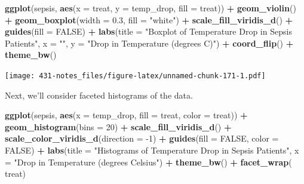 \documentclass[
]{book}
\newenvironment{Shaded}{\begin{snugshade}}{\end{snugshade}}
\newcommand{\DataTypeTok}[1]{\textcolor[rgb]{0.13,0.29,0.53}{#1}}
\newcommand{\DecValTok}[1]{\textcolor[rgb]{0.00,0.00,0.81}{#1}}
\newcommand{\FloatTok}[1]{\textcolor[rgb]{0.00,0.00,0.81}{#1}}
\newcommand{\KeywordTok}[1]{\textcolor[rgb]{0.13,0.29,0.53}{\textbf{#1}}}
\newcommand{\NormalTok}[1]{#1}
\newcommand{\OperatorTok}[1]{\textcolor[rgb]{0.81,0.36,0.00}{\textbf{#1}}}
\newcommand{\OtherTok}[1]{\textcolor[rgb]{0.56,0.35,0.01}{#1}}
\newcommand{\StringTok}[1]{\textcolor[rgb]{0.31,0.60,0.02}{#1}}
\begin{document}
\begin{Shaded}
\begin{Highlighting}[]
\KeywordTok{ggplot}\NormalTok{(sepsis, }\KeywordTok{aes}\NormalTok{(}\DataTypeTok{x =}\NormalTok{ treat, }\DataTypeTok{y =}\NormalTok{ temp_drop, }\DataTypeTok{fill =}\NormalTok{ treat)) }\OperatorTok{+}
\StringTok{    }\KeywordTok{geom_violin}\NormalTok{() }\OperatorTok{+}
\StringTok{    }\KeywordTok{geom_boxplot}\NormalTok{(}\DataTypeTok{width =} \FloatTok{0.3}\NormalTok{, }\DataTypeTok{fill =} \StringTok{"white"}\NormalTok{) }\OperatorTok{+}
\StringTok{    }\KeywordTok{scale_fill_viridis_d}\NormalTok{() }\OperatorTok{+}
\StringTok{    }\KeywordTok{guides}\NormalTok{(}\DataTypeTok{fill =} \OtherTok{FALSE}\NormalTok{) }\OperatorTok{+}\StringTok{ }
\StringTok{    }\KeywordTok{labs}\NormalTok{(}\DataTypeTok{title =} \StringTok{"Boxplot of Temperature Drop in Sepsis Patients"}\NormalTok{,}
         \DataTypeTok{x =} \StringTok{""}\NormalTok{, }\DataTypeTok{y =} \StringTok{"Drop in Temperature (degrees C)"}\NormalTok{) }\OperatorTok{+}\StringTok{ }
\StringTok{    }\KeywordTok{coord_flip}\NormalTok{() }\OperatorTok{+}
\StringTok{    }\KeywordTok{theme_bw}\NormalTok{()}
\end{Highlighting}
\end{Shaded}

\texttt{[image: 431-notes\_files/figure-latex/unnamed-chunk-171-1.pdf]}

Next, we'll consider faceted histograms of the data.

\begin{Shaded}
\begin{Highlighting}[]
\KeywordTok{ggplot}\NormalTok{(sepsis, }\KeywordTok{aes}\NormalTok{(}\DataTypeTok{x =}\NormalTok{ temp_drop, }\DataTypeTok{fill =}\NormalTok{ treat, }\DataTypeTok{color =}\NormalTok{ treat)) }\OperatorTok{+}
\StringTok{    }\KeywordTok{geom_histogram}\NormalTok{(}\DataTypeTok{bins =} \DecValTok{20}\NormalTok{) }\OperatorTok{+}
\StringTok{    }\KeywordTok{scale_fill_viridis_d}\NormalTok{() }\OperatorTok{+}
\StringTok{    }\KeywordTok{scale_color_viridis_d}\NormalTok{(}\DataTypeTok{direction =} \DecValTok{-1}\NormalTok{) }\OperatorTok{+}
\StringTok{    }\KeywordTok{guides}\NormalTok{(}\DataTypeTok{fill =} \OtherTok{FALSE}\NormalTok{, }\DataTypeTok{color =} \OtherTok{FALSE}\NormalTok{) }\OperatorTok{+}\StringTok{ }
\StringTok{    }\KeywordTok{labs}\NormalTok{(}\DataTypeTok{title =} \StringTok{"Histograms of Temperature Drop in Sepsis Patients"}\NormalTok{,}
         \DataTypeTok{x =} \StringTok{"Drop in Temperature (degrees Celsius"}\NormalTok{) }\OperatorTok{+}
\StringTok{    }\KeywordTok{theme_bw}\NormalTok{() }\OperatorTok{+}
\StringTok{    }\KeywordTok{facet_wrap}\NormalTok{(}\OperatorTok{~}\StringTok{ }\NormalTok{treat)}
\end{Highlighting}
\end{Shaded}
\end{document}

